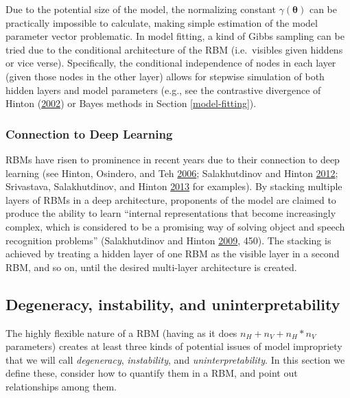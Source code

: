 \documentclass[]{article}
\theoremstyle{definition}
\newcommand{\nv}{{n_{\scriptscriptstyle V}}}
\newcommand{\nh}{{n_{\scriptscriptstyle H}}}
\begin{document}
Due to the potential size of the model, the normalizing constant
\(\gamma(\boldsymbol \theta)\) can be practically impossible to
calculate, making simple estimation of the model parameter vector
problematic. In model fitting, a kind of Gibbs sampling can be tried due
to the conditional architecture of the RBM (i.e.~visibles given hiddens
or vice verse). Specifically, the conditional independence of nodes in
each layer (given those nodes in the other layer) allows for stepwise
simulation of both hidden layers and model parameters (e.g., see the
contrastive divergence of Hinton
(\protect\hyperlink{ref-hinton2002training}{2002}) or Bayes methods in
Section \ref{model-fitting}).

\hypertarget{connection-to-deep-learning}{%
\subsubsection{Connection to Deep
Learning}\label{connection-to-deep-learning}}

RBMs have risen to prominence in recent years due to their connection to
deep learning (see Hinton, Osindero, and Teh
\protect\hyperlink{ref-hinton2006fast}{2006}; Salakhutdinov and Hinton
\protect\hyperlink{ref-salakhutdinov2012efficient}{2012}; Srivastava,
Salakhutdinov, and Hinton
\protect\hyperlink{ref-srivastava2013modeling}{2013} for examples). By
stacking multiple layers of RBMs in a deep architecture, proponents of
the model are claimed to produce the ability to learn ``internal
representations that become increasingly complex, which is considered to
be a promising way of solving object and speech recognition problems''
(Salakhutdinov and Hinton
\protect\hyperlink{ref-salakhutdinov2009deep}{2009}, 450). The stacking
is achieved by treating a hidden layer of one RBM as the visible layer
in a second RBM, and so on, until the desired multi-layer architecture
is created.

\hypertarget{degeneracy-instability-and-uninterpretability}{%
\subsection{Degeneracy, instability, and
uninterpretability}\label{degeneracy-instability-and-uninterpretability}}

The highly flexible nature of a RBM (having as it does
\(\nh + \nv + \nh*\nv\) parameters) creates at least three kinds of
potential issues of model impropriety that we will call
\emph{degeneracy}, \emph{instability}, and \emph{uninterpretability}. In
this section we define these, consider how to quantify them in a RBM,
and point out relationships among them.
\end{document}
